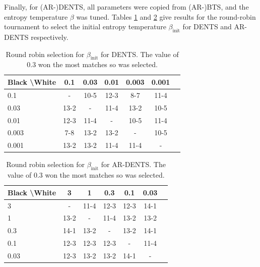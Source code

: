     
    
    
    
    
    
    
    
    Finally, for \mbox{(AR-)DENTS}, all parameters were copied from \mbox{(AR-)BTS}, and the entropy temperature $\beta$ was tuned. Tables \ref{tab:w070} and \ref{tab:x070} give results for the round-robin tournament to select the initial entropy temperature $\beta_{\text{init}}$ for DENTS and AR-DENTS respectively.
    
    
    \begin{table}[tbp]
    \centering
        \begin{tabular}{l|cccccc}
            \textbf{Black \textbackslash White}     & 0.1  & 0.03   & 0.01   & 0.003    & 0.001    \\ 
            \hline
                                    0.1            & - & 10-5 & 12-3 & 8-7 & 11-4  		\\
                                    0.03            & 13-2 & - & 11-4 & 13-2  & 10-5   		\\
                                    0.01            & 12-3 & 11-4 & - & 10-5 & 11-4  		\\
                                    0.003            & 7-8 & 13-2 & 13-2 & - & 10-5  		\\
                                    0.001           & 13-2 & 13-2 & 11-4 & 11-4 &  - 		\\
        \end{tabular}
        \caption[Round robin  selection for $\beta_{\text{init}}$ for DENTS.]{Round robin  selection for $\beta_{\text{init}}$ for DENTS. The value of 0.3 won the most matches so was selected. \label{tab:w070}}
    \end{table}
    
    \begin{table}[tbp]
    \centering
        \begin{tabular}{l|cccccc}
            \textbf{Black \textbackslash White}     & 3  & 1   & 0.3   & 0.1    & 0.03    \\ 
            \hline
                                    3            & - & 11-4 & 12-3 & 12-3 & 14-1  		\\
                                    1            & 13-2 & - & 11-4 & 13-2 & 13-2  		\\
                                    0.3            & 14-1 & 13-2 & - & 13-2 & 14-1  		\\
                                    0.1            & 12-3 & 12-3 & 12-3 & - & 11-4  		\\
                                    0.03            & 12-3 & 13-2 & 13-2 & 14-1 &  - 		\\
        \end{tabular}
        \caption[Round robin  selection for $\beta_{\text{init}}$ for AR-DENTS.]{Round robin  selection for $\beta_{\text{init}}$ for AR-DENTS. The value of 0.3 won the most matches so was selected. \label{tab:x070}}
    \end{table}
    
